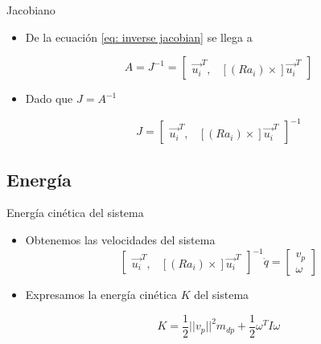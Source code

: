 \documentclass{beamer}
\begin{document}
\begin{frame}{Jacobiano}
 \begin{itemize}
  \item De la ecuación \ref{eq: inverse jacobian} se llega a 
  
  \begin{equation}\label{jac_A}
        A = J^{-1} = 
        \begin{bmatrix}
            \vec{u_i}^T, & [(Ra_i)\times]\vec{u_i}^T
        \end{bmatrix}
\end{equation}

\item Dado que $J = A ^{-1}$

\begin{equation}
J = \begin{bmatrix}
\vec{u_i}^T, & [(Ra_i)\times]\vec{u_i}^T
\end{bmatrix}^{-1}
\end{equation}
 \end{itemize}

\end{frame}

\subsection{Energía}
\begin{frame}{Energía cinética del sistema}

\begin{itemize}
 \item Obtenemos las velocidades del sistema
 \begin{equation}
\begin{bmatrix}
\vec{u_i}^T, & [(Ra_i)\times]\vec{u_i}^T
\end{bmatrix}^{-1} \dot{q} = \begin{bmatrix}
v_p\\
\omega
\end{bmatrix}
\end{equation}

\item Expresamos la energía cinética $K$ del sistema

\begin{equation}
 K = \frac{1}{2} ||v_{p}||^2 m_{dp}  + \frac{1}{2} \omega^T I \omega 
\end{equation}


\end{itemize}
\end{frame}
\end{document}
